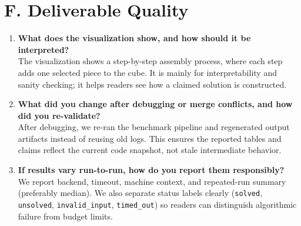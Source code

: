 \documentclass[11pt]{article}
\begin{document}
\section*{F. Deliverable Quality}
\begin{enumerate}[leftmargin=*,label=\textbf{Q\arabic*.},start=21]
\item \textbf{What does the visualization show, and how should it be interpreted?}\\
The visualization shows a step-by-step assembly process, where each step adds one selected piece to the cube. It is mainly for interpretability and sanity checking; it helps readers see how a claimed solution is constructed.

\item \textbf{What did you change after debugging or merge conflicts, and how did you re-validate?}\\
After debugging, we re-ran the benchmark pipeline and regenerated output artifacts instead of reusing old logs. This ensures the reported tables and claims reflect the current code snapshot, not stale intermediate behavior.

\item \textbf{If results vary run-to-run, how do you report them responsibly?}\\
We report backend, timeout, machine context, and repeated-run summary (preferably median). We also separate status labels clearly (\texttt{solved}, \texttt{unsolved}, \texttt{invalid\_input}, \texttt{timed\_out}) so readers can distinguish algorithmic failure from budget limits.
\end{enumerate}
\end{document}
